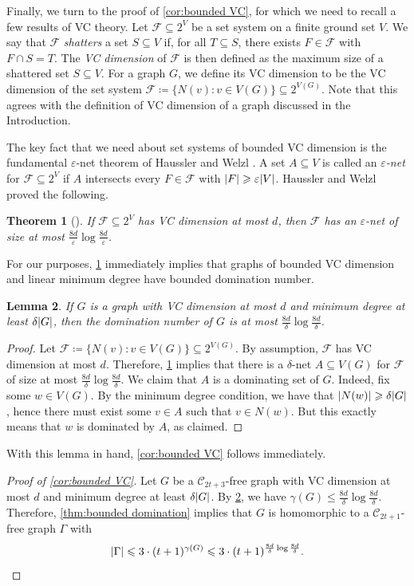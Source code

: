 \documentclass[reqno, english, 12pt]{amsart}
\theoremstyle{plain}
\newtheorem{theorem}{Theorem}[section]
\newtheorem{lemma}[theorem]{Lemma}
\theoremstyle{remark}
\newcommand{\cF}{\mathcal{F}}
\DeclarePairedDelimiter{\abs}{\lvert}{\rvert}
\renewcommand{\leq}{\leqslant}
\renewcommand{\geq}{\geqslant}
\newcommand\C{\mathscr{C}}
\begin{document}
Finally, we turn to the proof of \cref{cor:bounded VC}, for which we need to recall a few results of VC theory. Let $\cF \subseteq 2^V$ be a set system on a finite ground set $V$. We say that $\cF$ \emph{shatters} a set $S \subseteq V$ if, for all $T \subseteq S$, there exists $F \in \cF$ with $F \cap S = T$. The \emph{VC dimension} of $\cF$ is then defined as the maximum size of a shattered set $S \subseteq V$. For a graph $G$, we define its VC dimension to be the VC dimension of the set system $\cF \coloneqq \{N(v):v \in V(G)\} \subseteq 2^{V(G)}$. Note that this agrees with the definition of VC dimension of a graph discussed in the Introduction.

The key fact that we need about set systems of bounded VC dimension is the fundamental $\varepsilon$-net theorem of Haussler and Welzl \cite{MR884223}. A set $A \subseteq V$ is called an \emph{$\varepsilon$-net} for $\cF \subseteq 2^V$ if $A$ intersects every $F \in \cF$ with $\abs F \geq \varepsilon \abs V$. Haussler and Welzl proved the following.
\begin{theorem}[{\cite[Theorem 3.8]{MR884223}}]\label{thm:eps-nets}
    If $\cF\subseteq 2^V$ has VC dimension at most $d$, then $\cF$ has an $\varepsilon$-net of size at most $\frac{8d}{\varepsilon} \log \frac{8d}{\varepsilon}$.
\end{theorem}
For our purposes, \cref{thm:eps-nets} immediately implies that graphs of bounded VC dimension and linear minimum degree have bounded domination number.
\begin{lemma}\label{lem:VC implies domination}
    If $G$ is a graph with VC dimension at most $d$ and minimum degree at least $\delta \abs G$, then the domination number of $G$ is at most $\frac{8d}{\delta} \log \frac{8d}{\delta}$.
\end{lemma}
\begin{proof}
    Let $\cF \coloneqq \{N(v): v \in V(G)\} \subseteq 2^{V(G)}$. By assumption, $\cF$ has VC dimension at most $d$. Therefore, \cref{thm:eps-nets} implies that there is a $\delta$-net $A\subseteq V(G)$ for $\cF$ of size at most $\frac{8d}{\delta} \log \frac{8d}{\delta}$. We claim that $A$ is a dominating set of $G$. Indeed, fix some $w \in V(G)$. By the minimum degree condition, we have that $\abs{N(w)} \geq \delta \abs G$, hence there must exist some $v \in A$ such that $v \in N(w)$. But this exactly means that $w$ is dominated by $A$, as claimed.
\end{proof}
\noindent
With this lemma in hand, \cref{cor:bounded VC} follows immediately.
\begin{proof}[Proof of \cref{cor:bounded VC}]
    Let $G$ be a $\C_{2t+3}$-free graph with VC dimension at most $d$ and minimum degree at least $\delta \abs G$. By \cref{lem:VC implies domination}, we have $\gamma(G) \leq \frac{8d}{\delta} \log \frac{8d}{\delta}$. Therefore, \cref{thm:bounded domination} implies that $G$ is homomorphic to a $\C_{2t+1}$-free graph $\Gamma$ with
    \[
    \abs \Gamma \leq 3 \cdot (t+1)^{\gamma(G)}\leq 3 \cdot (t+1)^{\frac{8d}{\delta} \log \frac{8d}{\delta}}.\qedhere
    \]
\end{proof}
\end{document}
